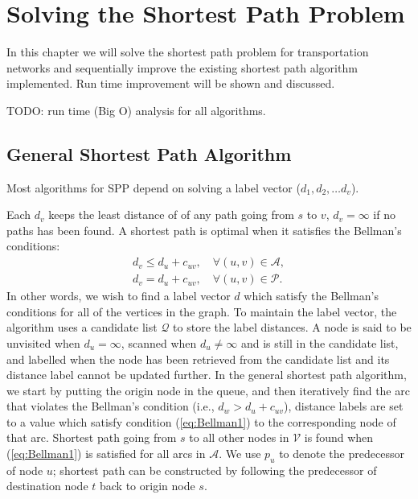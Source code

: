 \chapter{Solving the Shortest Path Problem}

In this chapter we will solve the shortest path problem
for transportation networks and sequentially
improve the existing shortest path algorithm implemented.
Run time improvement will be shown and discussed.

{
    TODO: run time (Big O) analysis for all algorithms.
}
\section{General Shortest Path Algorithm}
Most algorithms for SPP depend on solving a label vector ($d_1, d_2,\dots d_v$).

Each $d_v$ keeps the least distance of of any path going from $s$ to $v$, $d_v = \infty$ if no paths has been found.
A shortest path is optimal when it satisfies the Bellman's conditions:
\begin{align}
    d_v \leq d_u + c_{uv}, \quad \forall(u,v) \in \mathcal{A}, \label{eq:Bellman1}\\
    d_v  =   d_u + c_{uv}, \quad \forall(u,v) \in \mathcal{P}.
\end{align}
In other words,
we wish to find a label vector $d$ which satisfy the Bellman's conditions for all of the vertices in the graph.
To maintain the label vector, the algorithm uses a candidate list $\mathcal{Q}$ to store the label distances.
A node is said to be unvisited when $d_u = \infty$,
scanned when $d_u \neq \infty$ and is still in the candidate list,
and labelled when the node has been retrieved from the candidate list and its distance label cannot be updated further.
In the general shortest path algorithm,
we start by putting the origin node in the queue,
and then iteratively find the arc that violates the Bellman's condition (i.e., $d_w > d_u + c_{uv}$),
distance labels are set to a value which satisfy condition (\ref{eq:Bellman1}) to the corresponding node of that arc.
Shortest path going from $s$ to all other nodes in $\mathcal{V}$ is found when (\ref{eq:Bellman1}) is satisfied for all arcs in $\mathcal{A}$.
We use $p_u$ to denote the predecessor of node $u$;
shortest path can be constructed by following the predecessor of destination node $t$ back to origin node $s$.

